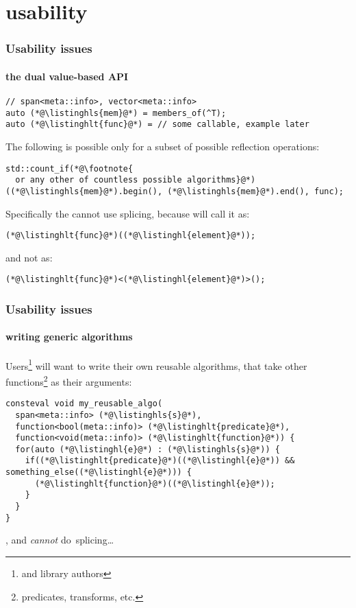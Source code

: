 \documentclass[compress,table,xcolor=table]{beamer}
\begin{document}
\section{usability}
\begin{frame}[fragile]
  \frametitle{Usability issues}
  \framesubtitle{the dual value-based API}
  \begin{lstlisting}[language=c++2x,basicstyle=\small\ttfamily]
// span<meta::info>, vector<meta::info>
auto (*@\listinghls{mem}@*) = members_of(^T);
auto (*@\listinghlt{func}@*) = // some callable, example later
  \end{lstlisting}
  The following is possible only for a subset of possible reflection
  operations:
  \begin{lstlisting}[language=c++2x,basicstyle=\small\ttfamily]
std::count_if(*@\footnote{
  or any other of countless possible algorithms}@*)((*@\listinghls{mem}@*).begin(), (*@\listinghls{mem}@*).end(), func);
  \end{lstlisting}
  Specifically the  cannot use splicing, because
   will call it as:
  \begin{lstlisting}[language=c++2x,basicstyle=\small\ttfamily]
(*@\listinghlt{func}@*)((*@\listinghl{element}@*));
  \end{lstlisting}
  and not as:
  \begin{lstlisting}[language=c++2x,basicstyle=\small\ttfamily]
(*@\listinghlt{func}@*)<(*@\listinghl{element}@*)>();
  \end{lstlisting}
\end{frame}
\begin{frame}[fragile]
  \frametitle{Usability issues}
  \framesubtitle{writing generic algorithms}
  Users\footnote{and library authors} will want to write their own reusable
  algorithms, that take other functions\footnote{predicates, transforms, etc.}
  as their arguments:
  \begin{lstlisting}[language=c++2x,basicstyle=\small\ttfamily]
consteval void my_reusable_algo(
  span<meta::info> (*@\listinghls{s}@*),
  function<bool(meta::info)> (*@\listinghlt{predicate}@*),
  function<void(meta::info)> (*@\listinghlt{function}@*)) {
  for(auto (*@\listinghl{e}@*) : (*@\listinghls{s}@*)) {
    if((*@\listinghlt{predicate}@*)((*@\listinghl{e}@*)) && something_else((*@\listinghl{e}@*))) {
      (*@\listinghlt{function}@*)((*@\listinghl{e}@*));
    }
  }
}
  \end{lstlisting}
  ,  and 
  {\em \larger cannot} do~splicing\ldots
\end{frame}
\end{document}
